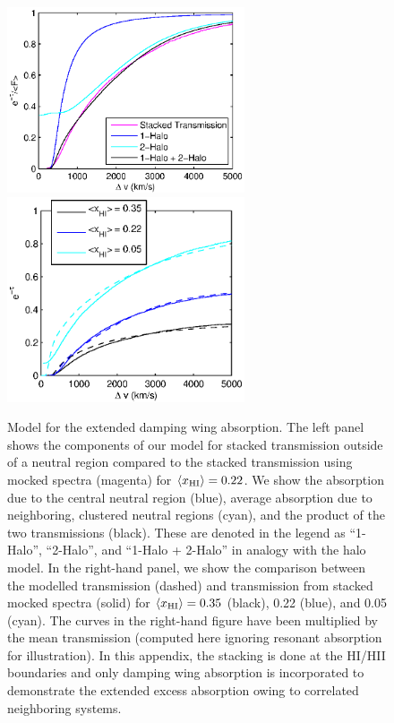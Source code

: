 \begin{figure}[!ht]
  \centering
	\includegraphics[width=7cm]{fig13a.eps}
	\includegraphics[width=7cm]{fig13b.eps}
  \caption{Model for the extended damping wing absorption. The left panel shows the components of our model for stacked transmission outside of a neutral region compared to the stacked transmission using mocked spectra (magenta) for $\langle x_{\text{HI}}\rangle = 0.22$. We show the absorption due to the central neutral region (blue), average absorption due to neighboring, clustered neutral regions (cyan), and the product of the two transmissions (black). These are denoted in the legend as ``1-Halo'', ``2-Halo'', and ``1-Halo + 2-Halo'' in analogy with the halo model. In the right-hand panel, we show the comparison between the modelled transmission (dashed) and transmission from stacked mocked spectra (solid) for $\langle x_{\text{HI}}\rangle = 0.35$ (black), 0.22 (blue), and 0.05 (cyan). The curves in the right-hand figure have been multiplied by the mean transmission (computed here ignoring resonant absorption for illustration).  In this appendix, the stacking is done at the HI/HII boundaries and only damping wing absorption is incorporated to demonstrate the extended excess absorption owing to correlated neighboring systems.}
  \label{fig:HaloParts}
\end{figure}
